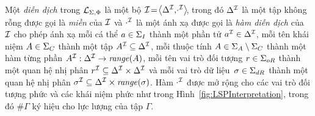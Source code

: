 \begin{Definition}
\label{def:LSPInterpretation}
Một {\em diễn dịch} trong $\mathcal{L}_{\Sigma,\Phi}$ là một bộ \mbox{$\mathcal{I}\!=\! \left\langle\Delta^{\mathcal{I}},\!\cdot^{\mathcal{I}}\right\rangle\!$}, trong đó $\Delta^{\mathcal{I}}$ là một tập không rỗng được gọi là {\em miền} của $\mathcal{I}$ và $\cdot^{\mathcal{I}}$ là một ánh xạ được gọi là {\em hàm diễn dịch} của $\mathcal{I}$ cho phép ánh xạ mỗi cá thể $a \in \Sigma_I$ thành một phần tử $a^{\mathcal{I}} \in \Delta^{\mathcal{I}}$, mỗi tên khái niệm $A \in \Sigma_C$ thành một tập $A^{\mathcal{I}} \subseteq \Delta^{\mathcal{I}}$, mỗi thuộc tính $A \in \Sigma_A \setminus \Sigma_C$ thành một hàm từng phần $A^{\mathcal{I}} : \Delta^{\mathcal{I}} \to \mathit{range}(A)$, mỗi tên vai trò đối tượng $r \in \Sigma_{oR}$ thành một quan hệ nhị phân $r^{\mathcal{I}} \subseteq \Delta^{\mathcal{I}} \times \Delta^{\mathcal{I}}$ và mỗi vai trò dữ liệu~$\sigma \in \Sigma_{dR}$ thành một quan hệ nhị phân $\sigma^{\mathcal{I}} \subseteq \Delta^{\mathcal{I}} \times \mathit{range}(\sigma)$.
Hàm $\cdot^{\mathcal{I}}$ được mở rộng cho các vai trò đối tượng phức và các khái niệm phức như trong Hình~\ref{fig:LSPInterpretation}, trong đó $\#\Gamma$ ký hiệu cho lực lượng của tập $\Gamma$.\myend
\end{Definition}

